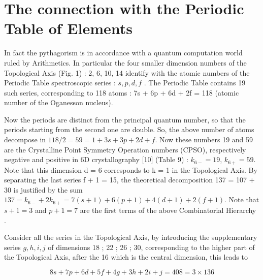 \documentclass[a4paper,9pt]{article}
\begin{document}

\section{The connection with the Periodic Table of Elements}

     In fact the pythagorism is in accordance with a quantum computation world ruled by Arithmetics. In particular the four smaller dimension numbers of the Topological Axis (Fig. 1) : 2, 6, 10, 14 identify with the atomic numbers of the Periodic Table spectroscopic series : $s, p, d, f$ . The Periodic Table contains 19 such series, corresponding to 118 atoms : 7s + 6p + 6d + 2f = 118 (atomic number of the Oganesson nucleus). 

     Now the periods are distinct from the principal quantum number, so that the periods starting from the second one are double. So, the above number of atoms decompose in $118/2 = 59 = 1 + 3s + 3p + 2d + f$. Now these numbers 19 and 59 are the Crystalline Point Symmetry Operation numbers (CPSO), respectively negative and positive in 6D crystallography [10] (Table 9) : $k_{6-} = 19$, $k_{6+} = 59$. Note that this dimension d = 6 corresponds to k = 1 in the Topological Axis. By separating the last series f + 1 = 15, the theoretical decomposition 137 = 107 + 30 is justified by the sum $137 =  k_{6-} + 2k_{6+} = 7(s +1) + 6(p +1) + 4(d +1) + 2(f +1)$. Note that $s + 1 = 3$ and $p + 1 = 7$ are the first terms of the above Combinatorial Hierarchy\cite{Bastin} .

     Consider all the series in the Topological Axis, by introducing the supplementary series $g, h, i, j$ of dimensions 18 ; 22 ; 26 ; 30, corresponding to the higher part of the Topological Axis, after the 16 which is the central dimension, this leads to
     
     \begin{equation}
      8s + 7p + 6 d + 5f + 4g + 3h + 2i + j = 408 = 3 \times 136   
     \end{equation}
      
\end{document}
